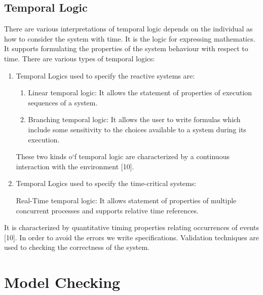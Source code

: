 \documentclass{article}
\begin{document}
\subsection{Temporal Logic}
\label{sec:templog}

There are various interpretations of temporal logic depends on the individual as how to consider the system with time. It is the logic for expressing mathematics. It supports formulating the properties of the system behaviour with respect to time. There are various types of temporal logics:
\begin{enumerate}
\item Temporal Logics used to specify the reactive systems are:
  \begin{enumerate}
  \item Linear temporal logic:  It allows the statement of properties of execution sequences of a system.
  \item Branching temporal logic: It allows the user to write formulas which include some sensitivity to the choices available to a system during its execution.
  \end{enumerate}
These two kinds o`f temporal logic are characterized by a continuous interaction with the environment [10].
\item Temporal Logics used to specify the time-critical systems:

Real-Time temporal logic: It allows statement of properties of multiple concurrent processes and supports relative time references.
\end{enumerate}

It is characterized by quantitative timing properties relating occurrences of events [10].
In order to avoid the errors we write specifications. Validation techniques are used to checking the correctness of the system.



\section{Model Checking}
\label{sec:modelchecking}
\end{document}
